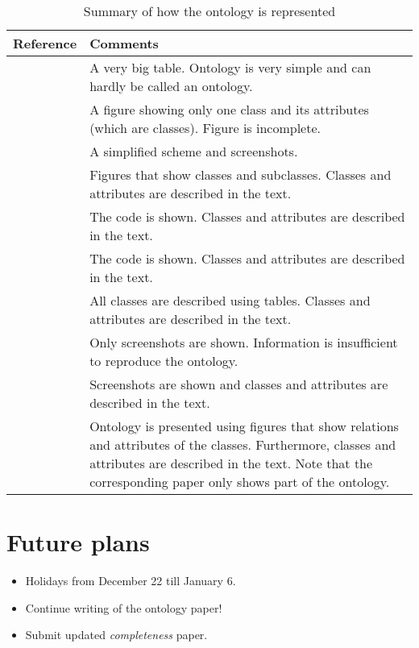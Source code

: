 \documentclass[10pt,final,a4paper,oneside,onecolumn]{article}
\newcommand{\otoprule}{\midrule[\heavyrulewidth]}
\begin{document}
\begin{table}
	\caption{Summary of how the ontology is represented}
	\label{tbl:ontology papers}
	\begin{tabularx}{\linewidth}{l X}
		\toprule
		Reference & Comments \\ \otoprule
		\cite{jones2011international} & A very big table. Ontology is very simple and can hardly be called an ontology. \\
		\cite{geyer2014} & A figure showing only one class and its attributes (which are classes). Figure is incomplete. \\
		\cite{gkoutos2004mouse} & A simplified scheme and screenshots. \\
		\cite{kim2005security} & Figures that show classes and subclasses. Classes and attributes are described in the text. \\
		\cite{chen2004soupa} & The code is shown. Classes and attributes are described in the text. \\
		\cite{chen2003ontology} & The code is shown. Classes and attributes are described in the text. \\
		\cite{golemati2007creating} & All classes are described using tables. Classes and attributes are described in the text. \\
		\cite{lee2017location} & Only screenshots are shown. Information is insufficient to reproduce the ontology. \\
		\cite{matsokis2010plm} & Screenshots are shown and classes and attributes are described in the text. \\
		\cite{vanDamPhDThesis2009} & Ontology is presented using figures that show relations and attributes of the classes. Furthermore, classes and attributes are described in the text. Note that the corresponding paper \cite{vanDam2010model} only shows part of the ontology. \\
		\bottomrule
	\end{tabularx}
\end{table}

\section{Future plans}

\begin{itemize}
	\item Holidays from December 22 till January 6. 
	\item Continue writing of the ontology paper!
	\item Submit updated \emph{completeness} paper.
\end{itemize}


\printbibliography

\newpage

\newpage

\end{document}
